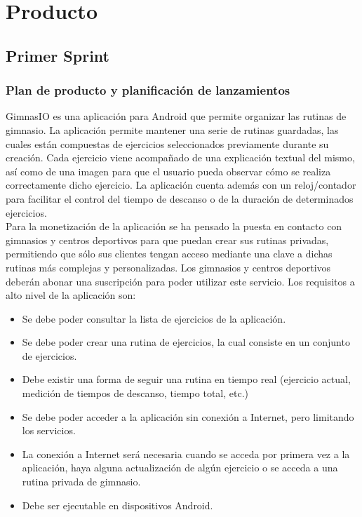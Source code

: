 \documentclass[11pt,a4paper]{report}
\begin{document}
\chapter{Producto}
\section{Primer Sprint}
\subsection{Plan de producto y planificación de lanzamientos}
GimnasIO es una aplicación para Android que permite organizar las rutinas de gimnasio. La aplicación permite mantener una serie de rutinas guardadas, las cuales están compuestas de ejercicios seleccionados previamente durante su creación. Cada ejercicio viene acompañado de una explicación textual del mismo, así como de una imagen para que el usuario pueda observar cómo se realiza correctamente dicho ejercicio. La aplicación cuenta además con un reloj/contador para facilitar el control del tiempo de descanso o de la duración de determinados ejercicios.
\\Para la monetización de la aplicación se ha pensado la puesta en contacto con gimnasios y centros deportivos para que puedan crear sus rutinas privadas, permitiendo que sólo sus clientes tengan acceso mediante una clave a dichas rutinas más complejas y personalizadas. Los gimnasios y centros deportivos deberán abonar una suscripción para poder utilizar este servicio.
\newline Los requisitos a alto nivel de la aplicación son:
\begin{itemize}
	\item Se debe poder consultar la lista de ejercicios de la aplicación.
	\item Se debe poder crear una rutina de ejercicios, la cual consiste en un conjunto de ejercicios.
	\item Debe existir una forma de seguir una rutina en tiempo real (ejercicio actual, medición de tiempos de
	descanso, tiempo total, etc.)
	\item Se debe poder acceder a la aplicación sin conexión a Internet, pero limitando los servicios.
	\item La conexión a Internet será necesaria cuando se acceda por primera vez a la aplicación, haya alguna
	actualización de algún ejercicio o se acceda a una rutina privada de gimnasio.	
	\item Debe ser ejecutable en dispositivos Android.
\end{itemize}
\end{document}

